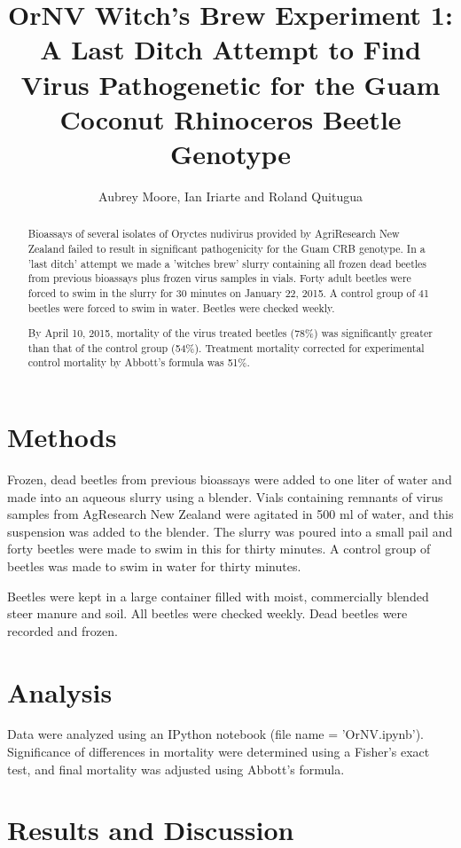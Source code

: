 \documentclass[letterpaper,11pt]{scrartcl}
\title{OrNV Witch's Brew Experiment 1: A Last Ditch Attempt to Find Virus Pathogenetic for the Guam Coconut
Rhinoceros Beetle Genotype}
\author{Aubrey Moore, Ian Iriarte and Roland Quitugua}
\begin{document}
\maketitle

\begin{abstract}
Bioassays of several isolates of Oryctes nudivirus provided by AgriResearch New Zealand failed to result in 
significant pathogenicity for the Guam CRB genotype. In a 'last ditch' attempt we made a 'witches brew' slurry 
containing all frozen dead beetles from previous bioassays plus frozen virus samples in vials. Forty 
adult beetles were forced to swim in the slurry for 30 minutes on January 22, 2015. A control group of
41 beetles were forced to swim in water. Beetles were checked weekly.

By April 10, 2015, mortality of the virus treated beetles (78\%) was significantly greater than that of the
control group (54\%). Treatment mortality corrected for experimental control mortality by Abbott's 
formula was 51\%.
\end{abstract}

\section*{Methods}

Frozen, dead beetles from previous bioassays were added to one liter of water and made into an aqueous slurry
using a blender. Vials containing remnants of virus samples from AgResearch New Zealand were agitated in 500 ml of 
water, and this suspension was added to the blender. The slurry was poured into a small pail and
forty beetles were made to swim in this for thirty minutes. A control group of beetles was made to swim in water for 
thirty minutes.

Beetles were kept in a large container filled with moist, commercially blended steer manure and soil. 
All beetles were checked weekly. Dead beetles were recorded and frozen.

\section*{Analysis}

Data were analyzed using an IPython notebook (file name = 'OrNV.ipynb'). Significance of differences in mortality
were determined using a Fisher's exact test, and final mortality was adjusted using Abbott's formula.

\section*{Results and Discussion}
\end{document}
